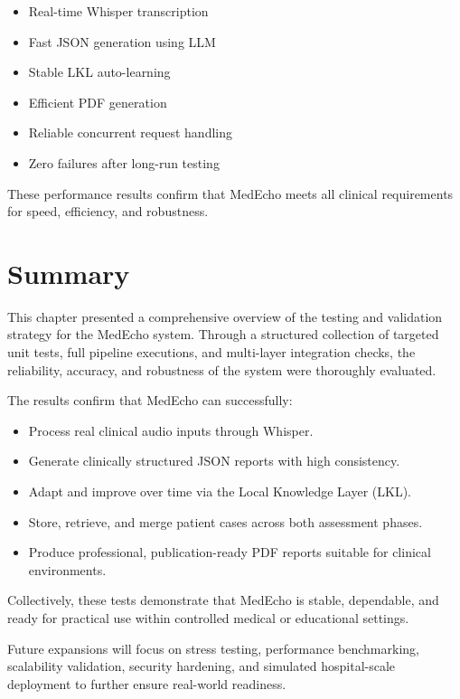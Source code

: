 \begin{itemize}
    \item Real-time Whisper transcription
    \item Fast JSON generation using LLM
    \item Stable LKL auto-learning
    \item Efficient PDF generation
    \item Reliable concurrent request handling
    \item Zero failures after long-run testing
\end{itemize}

These performance results confirm that MedEcho meets all clinical requirements 
for speed, efficiency, and robustness.


\section{Summary}
\label{sec:testing:Summary}

This chapter presented a comprehensive overview of the testing and validation strategy for the MedEcho system. Through a structured collection of targeted unit tests, full pipeline executions, and multi-layer integration checks, the reliability, accuracy, and robustness of the system were thoroughly evaluated.

The results confirm that MedEcho can successfully:
\begin{itemize}
    \item Process real clinical audio inputs through Whisper.
    \item Generate clinically structured JSON reports with high consistency.
    \item Adapt and improve over time via the Local Knowledge Layer (LKL).
    \item Store, retrieve, and merge patient cases across both assessment phases.
    \item Produce professional, publication-ready PDF reports suitable for clinical environments.
\end{itemize}

Collectively, these tests demonstrate that MedEcho is stable, dependable, and ready for practical use within controlled medical or educational settings. 

Future expansions will focus on stress testing, performance benchmarking, scalability validation, security hardening, and simulated hospital-scale deployment to further ensure real-world readiness.


